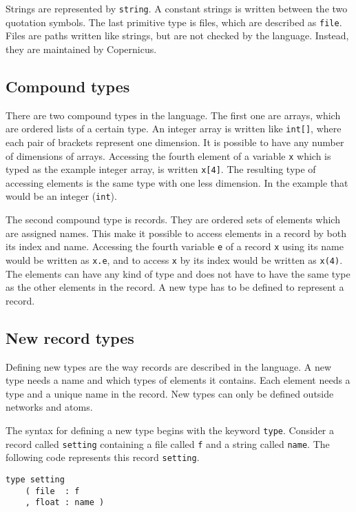 Strings are represented by \verb#string#. A constant strings is
written between the two quotation symbols. The last primitive type is
files, which are described as \verb#file#. Files are paths written
like strings, but are not checked by the language. Instead, they are
maintained by Copernicus.


\subsection{Compound types}\label{sec:compound}
There are two compound types in the language. The first one are
arrays, which are ordered lists of a certain type. An integer array is
written like \verb#int[]#, where each pair of brackets represent one
dimension. It is possible to have any number of dimensions of
arrays. Accessing the fourth element of a variable \verb#x# which is
typed as the example integer array, is written \verb#x[4]#. The
resulting type of accessing elements is the same type with one less
dimension. In the example that would be an integer (\verb#int#).

The second compound type is records. They are ordered sets of elements
which are assigned names. This make it possible to access elements in
a record by both its index and name. Accessing the fourth variable
\verb#e# of a record \verb#x# using its name would be written as
\verb#x.e#, and to access \verb#x# by its index would be written as
\verb#x(4)#. The elements can have any kind of type and does not have
to have the same type as the other elements in the record. A new type
has to be defined to represent a record.


\subsection{New record types}
Defining new types are the way records are described in the
language. A new type needs a name and which types of elements it
contains. Each element needs a type and a unique name in the
record. New types can only be defined outside networks and atoms.

The syntax for defining a new type begins with the keyword
\verb#type#. Consider a record called \verb#setting# containing a file
called \verb#f# and a string called \verb#name#. The following code
represents this record \verb#setting#.

\begin{verbatim}
type setting
    ( file  : f
    , float : name )
\end{verbatim}

